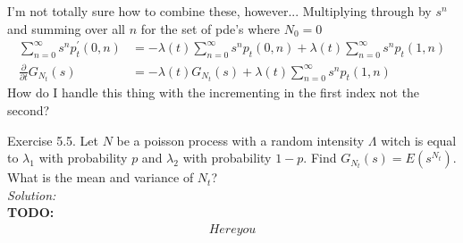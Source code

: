 \documentclass[10pt]{amsart}
\begin{document}
I'm not totally sure how to combine these, however...
Multiplying through by $s^n$ and summing over all $n$ for the set of pde's where $N_0 = 0$
\begin{align*}
\sum_{n=0}^\infty s^n p^\prime_t(0,n)
	&= - \lambda(t) \sum_{n=0}^\infty s^n p_t(0,n) + \lambda(t)  \sum_{n=0}^\infty s^n p_t(1,n) \\
\frac {\partial}{\partial t} G_{N_t}(s)
	&= - \lambda(t) G_{N_t}(s) + \lambda(t)  \sum_{n=0}^\infty s^n p_t(1,n)
\end{align*}
How do I handle this thing with the incrementing in the first index not the second?
\newpage

 Exercise 5.5.
Let $N$ be a poisson process with a random intensity $\Lambda$ witch is equal to $\lambda_1$ with probability $p$ and $\lambda_2$ with probability $1 - p$.
Find $G_{N_t}(s) = E(s^{N_t})$.
What is the mean and variance of $N_t$? \\

\noindent
\textit{Solution:} \\
\textbf{TODO:} \\
\begin{align*}
Here you
\end{align*}
\end{document}
